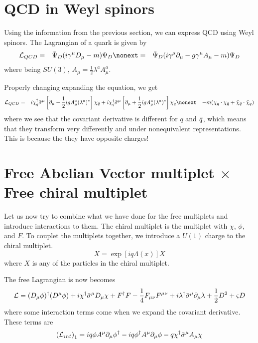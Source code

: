 \section{QCD in Weyl spinors}
\label{ch:10:qcd in weyl spinors}
Using the information from the previous section, we can express QCD using Weyl spinors. The Lagrangian of a quark is given by
\begin{eqnarray}
    \mathcal{L}_{QCD} &=& \Bar{\Psi}_D (i\gamma^\mu D_\mu - m)\Psi_D \nonext
    &=& \Bar{\Psi}_D (i\gamma^\mu \partial_\mu - g\gamma^\mu A_\mu - m) \Psi_D
\end{eqnarray}
where being $SU(3)$, $A_\mu = \frac{1}{2} \lambda^a A_\mu^a$.

Properly changing expanding the equation, we get
\begin{eqnarray}
    \mathcal{L}_{QCD} &=& i \chi^\dagger_{\Bar{q}} \Bar{\sigma}^\mu \left[ \partial_\mu -\frac{1}{2} igA^a_\mu (\lambda^a)^*\right] \chi_{\Bar{q}} + i \chi^\dagger_q \Bar{\sigma}^\mu \left[ \partial_\mu +\frac{1}{2} igA^a_\mu (\lambda^a)^*\right] \chi_q \nonext
    && - m(\chi_q\cdot\chi_{\Bar{q}} + \Bar{\chi}_{\Bar{q}}\cdot\Bar{\chi}_q)
\end{eqnarray}
where we see that the covariant derivative is different for $q$ and $\Bar{q}$, which means that they transform very differently and under nonequivalent representations. This is because the they have opposite charges!

\section{Free Abelian Vector multiplet $\times$ Free chiral multiplet}
\label{ch:10:free combination}
Let us now try to combine what we have done for the free multiplets and introduce interactions to them. The chiral multiplet is the multiplet with $\chi$, $\phi$, and $F$. To couplet the multiplets together, we introduce a $U(1)$ charge to the chiral multiplet.
\begin{equation}
    X = \exp[i q \Lambda(x)] X
\end{equation}
where $X$ is any of the particles in the chiral multiplet.

The free Lagrangian is now becomes
\begin{equation}
    \mathcal{L} = (D_\mu \phi)^\dagger (D^\mu \phi) + i \chi^\dagger \Bar{\sigma}^\mu D_\mu \chi + F^\dagger F - \frac{1}{4} F_{\mu \nu} F^{\mu \nu} + i\lambda^\dagger \Bar{\sigma}^\mu \partial_\mu \lambda + \frac{1}{2}D^2 + \varsigma D
    \label{eqn:10:free abeleian x free chiral:new free lagrangian}
\end{equation}
where some interaction terms come when we expand the covariant derivative. These terms are
\begin{equation}
    \left(\mathcal{L}_{int}\right)_1 = iq \phi A^\mu \partial_\mu \phi^\dagger - iq \phi^\dagger A^\mu \partial_\mu \phi - q\chi^\dagger \Bar{\sigma}^\mu A_\mu \chi
\end{equation}

